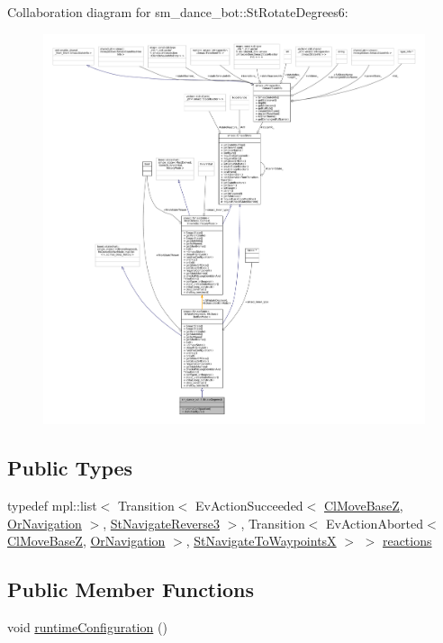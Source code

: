 Collaboration diagram for sm\+\_\+dance\+\_\+bot\+:\+:St\+Rotate\+Degrees6\+:
\nopagebreak
\begin{figure}[H]
\begin{center}
\leavevmode
\includegraphics[width=350pt]{structsm__dance__bot_1_1StRotateDegrees6__coll__graph}
\end{center}
\end{figure}
\subsection*{Public Types}
\begin{DoxyCompactItemize}
\item 
typedef mpl\+::list$<$ Transition$<$ Ev\+Action\+Succeeded$<$ \hyperlink{classmove__base__z__client_1_1ClMoveBaseZ}{Cl\+Move\+BaseZ}, \hyperlink{classsm__dance__bot_1_1OrNavigation}{Or\+Navigation} $>$, \hyperlink{structsm__dance__bot_1_1StNavigateReverse3}{St\+Navigate\+Reverse3} $>$, Transition$<$ Ev\+Action\+Aborted$<$ \hyperlink{classmove__base__z__client_1_1ClMoveBaseZ}{Cl\+Move\+BaseZ}, \hyperlink{classsm__dance__bot_1_1OrNavigation}{Or\+Navigation} $>$, \hyperlink{structsm__dance__bot_1_1StNavigateToWaypointsX}{St\+Navigate\+To\+WaypointsX} $>$ $>$ \hyperlink{structsm__dance__bot_1_1StRotateDegrees6_a6f12012f35d4f854115f900ea511d75d}{reactions}
\end{DoxyCompactItemize}
\subsection*{Public Member Functions}
\begin{DoxyCompactItemize}
\item 
void \hyperlink{structsm__dance__bot_1_1StRotateDegrees6_a0cc07534128303fa1af33ab4d57b440c}{runtime\+Configuration} ()
\end{DoxyCompactItemize}
